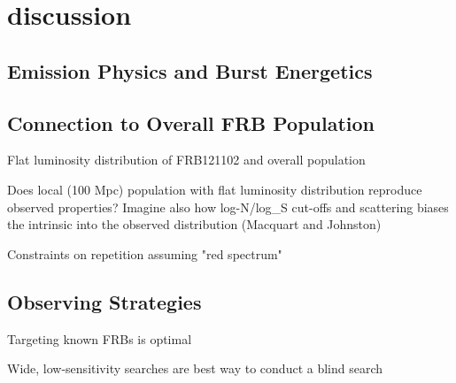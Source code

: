 \section{discussion}

\subsection{Emission Physics and Burst Energetics}



\subsection{Connection to Overall FRB Population}

Flat luminosity distribution of FRB121102 and overall population

Does local (100 Mpc) population with flat luminosity distribution reproduce observed properties? Imagine also how log-N/log_S cut-offs and scattering biases the intrinsic into the observed distribution (Macquart and Johnston)

Constraints on repetition assuming "red spectrum"

\subsection{Observing Strategies}

Targeting known FRBs is optimal

Wide, low-sensitivity searches are best way to conduct a blind search